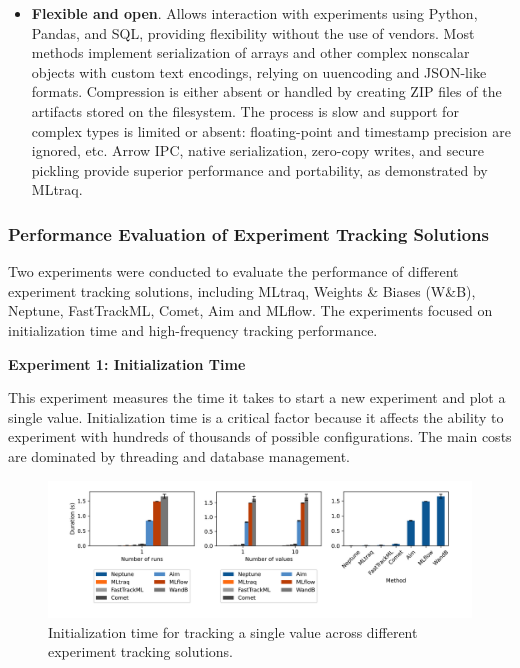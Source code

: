 \begin{itemize}
\begin{itemize}
    \item \textbf{Flexible and open}. Allows interaction with experiments using Python, Pandas, and SQL, providing flexibility without the use of vendors. Most methods implement serialization of arrays and other complex nonscalar objects with custom text encodings, relying on uuencoding and JSON-like formats. Compression is either absent or handled by creating ZIP files of the artifacts stored on the filesystem. The process is slow and support for complex types is limited or absent: floating-point and timestamp precision are ignored, etc. Arrow IPC, native serialization, zero-copy writes, and secure pickling provide superior performance and portability, as demonstrated by MLtraq. \cite{mltraq2024}
\end{itemize}

\subsubsection{Performance Evaluation of Experiment Tracking Solutions}

Two experiments were conducted to evaluate the performance of different experiment tracking solutions, including MLtraq, Weights \& Biases (W\&B), Neptune, FastTrackML, Comet, Aim and MLflow. The experiments focused on initialization time and high-frequency tracking performance. \newline

\textbf{Experiment 1: Initialization Time}

This experiment measures the time it takes to start a new experiment and plot a single value. Initialization time is a critical factor because it affects the ability to experiment with hundreds of thousands of possible configurations. The main costs are dominated by threading and database management.

\begin{figure}[h!]
    \centering
    \includegraphics[width=\textwidth]{images/mltraq/mltraq-Initialization-time.png}
    \caption{Initialization time for tracking a single value across different experiment tracking solutions.}
    \label{fig:init-time}
\end{figure}


\end{itemize}
